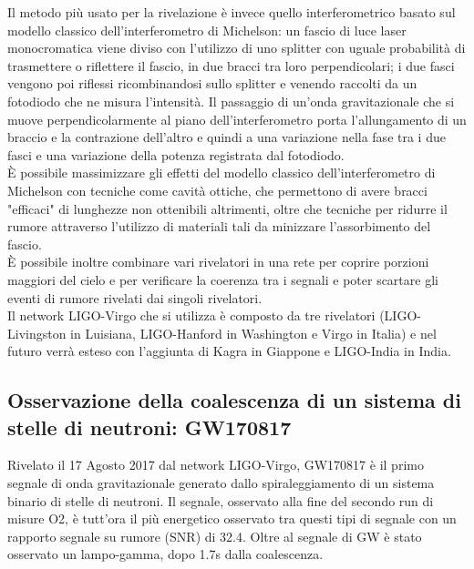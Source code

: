 Il metodo più usato per la rivelazione è invece quello interferometrico basato sul modello classico dell'interferometro di Michelson: un fascio di luce laser monocromatica viene diviso con l'utilizzo di uno splitter con uguale probabilità di trasmettere o riflettere il fascio, in due bracci tra loro perpendicolari; i due fasci vengono poi riflessi ricombinandosi sullo splitter e venendo raccolti da un fotodiodo che ne misura l'intensità. Il passaggio di un'onda gravitazionale che si muove perpendicolarmente al piano dell'interferometro porta l'allungamento di un braccio e la contrazione dell'altro e quindi a una variazione nella fase tra i due fasci e una variazione della potenza registrata dal fotodiodo.\\
È possibile massimizzare gli effetti del modello classico dell'interferometro di Michelson con tecniche come cavità ottiche, che permettono di avere bracci "efficaci" di lunghezze non ottenibili altrimenti, oltre che tecniche per ridurre il rumore attraverso l'utilizzo di materiali tali da minizzare l'assorbimento del fascio.\\
È possibile inoltre combinare vari rivelatori in una rete per coprire porzioni maggiori del cielo e per verificare la coerenza tra i segnali e poter scartare gli eventi di rumore rivelati dai singoli rivelatori.\\
Il network LIGO-Virgo che si utilizza è composto da tre rivelatori (LIGO-Livingston in Luisiana, LIGO-Hanford in Washington e Virgo in Italia) e nel futuro verrà esteso con l'aggiunta di Kagra in Giappone e LIGO-India in India.
\subsection{Osservazione della coalescenza di un sistema di stelle di neutroni: GW170817}
\label{section:osservazioneInspiralGW170817} 
Rivelato il 17 Agosto 2017 dal network LIGO-Virgo, GW170817 è il primo segnale di onda gravitazionale generato dallo spiraleggiamento di un sistema binario di stelle di neutroni.
Il segnale, osservato alla fine del secondo run di misure O2, è tutt'ora il più energetico osservato tra questi tipi di segnale con un rapporto segnale su rumore (SNR) di 32.4.
Oltre al segnale di GW è stato osservato un lampo-gamma, dopo 1.7s dalla coalescenza.

